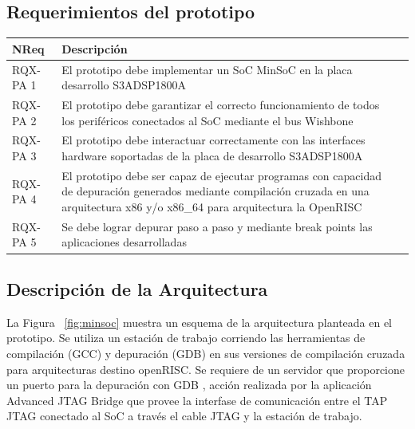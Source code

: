 		\subsection{Requerimientos del prototipo}
		\begin{table}[h]
		\centering
		\begin{tabular}{ p{2.5cm} p{8cm} p{3cm} }
		\hline 
		\rowcolor[gray]{0.8} N\textordmasculine Req & Descripción\\
		\hline 
		RQX-PA 1 & El prototipo debe implementar un SoC MinSoC en la placa desarrollo S3ADSP1800A\\ 
		\hline 
		RQX-PA 2 & El prototipo debe garantizar el correcto funcionamiento de todos los periféricos conectados al SoC mediante el bus Wishbone\\ 
		\hline 
		RQX-PA 3 & El prototipo debe interactuar correctamente con las interfaces hardware soportadas de la placa de desarrollo S3ADSP1800A\\ 
		\hline
		RQX-PA 4 & El prototipo debe ser capaz de ejecutar programas con capacidad de depuración generados mediante compilación
		cruzada en una arquitectura x86 y/o x86\_64 para arquitectura la OpenRISC\\
		\hline
		RQX-PA 5 & Se debe lograr depurar paso a paso y mediante break points las aplicaciones desarrolladas\\
		\hline		
		\end{tabular}
		\end{table}
		
\newpage
		\subsection{Descripción de la Arquitectura}
	
		La Figura ~\ref{fig:minsoc} muestra un esquema de la arquitectura planteada en el prototipo. Se utiliza un estación de trabajo corriendo las
		herramientas de compilación (GCC) y depuración (GDB) en sus versiones de compilación cruzada para arquitecturas destino openRISC. Se requiere de un
		servidor que proporcione un puerto para la depuración con GDB , acción realizada por la aplicación Advanced JTAG Bridge que provee la interfase de
		comunicación entre el TAP JTAG conectado al SoC a través el cable JTAG y la estación de trabajo.
		
